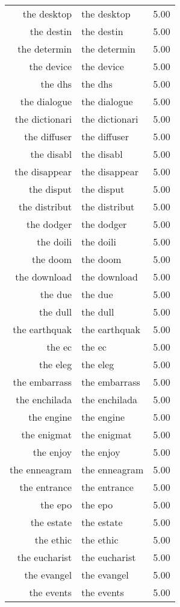 \begin{table}[ht]
\begin{tabular}{rlr}
  the desktop & the desktop & 5.00 \\ 
  the destin & the destin & 5.00 \\ 
  the determin & the determin & 5.00 \\ 
  the device & the device & 5.00 \\ 
  the dhs & the dhs & 5.00 \\ 
  the dialogue & the dialogue & 5.00 \\ 
  the dictionari & the dictionari & 5.00 \\ 
  the diffuser & the diffuser & 5.00 \\ 
  the disabl & the disabl & 5.00 \\ 
  the disappear & the disappear & 5.00 \\ 
  the disput & the disput & 5.00 \\ 
  the distribut & the distribut & 5.00 \\ 
  the dodger & the dodger & 5.00 \\ 
  the doili & the doili & 5.00 \\ 
  the doom & the doom & 5.00 \\ 
  the download & the download & 5.00 \\ 
  the due & the due & 5.00 \\ 
  the dull & the dull & 5.00 \\ 
  the earthquak & the earthquak & 5.00 \\ 
  the ec & the ec & 5.00 \\ 
  the eleg & the eleg & 5.00 \\ 
  the embarrass & the embarrass & 5.00 \\ 
  the enchilada & the enchilada & 5.00 \\ 
  the engine & the engine & 5.00 \\ 
  the enigmat & the enigmat & 5.00 \\ 
  the enjoy & the enjoy & 5.00 \\ 
  the enneagram & the enneagram & 5.00 \\ 
  the entrance & the entrance & 5.00 \\ 
  the epo & the epo & 5.00 \\ 
  the estate & the estate & 5.00 \\ 
  the ethic & the ethic & 5.00 \\ 
  the eucharist & the eucharist & 5.00 \\ 
  the evangel & the evangel & 5.00 \\ 
  the events & the events & 5.00 \\ 

\end{tabular}
\end{table}
